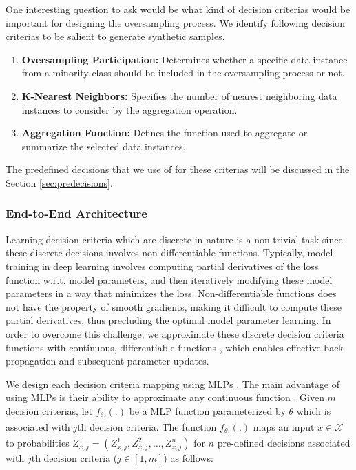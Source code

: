 One interesting question to ask would be what kind of decision criterias would be important for designing the oversampling process. We identify following decision criterias to be salient to generate synthetic samples. 
\begin{enumerate}
\item \textbf{Oversampling Participation:} Determines whether a specific data instance from a minority class should be included in the oversampling process or not.
\item \textbf{K-Nearest Neighbors:} Specifies the number of nearest neighboring data instances to consider by the aggregation operation.
\item \textbf{Aggregation Function:} Defines the function used to aggregate or summarize the selected data instances.  
\end{enumerate}

The predefined decisions that we use of for these criterias will be discussed in the Section \ref{sec:predecisions}.
\subsubsection{End-to-End Architecture}

Learning decision criteria which are discrete in nature is a non-trivial task since these discrete decisions  involves non-differentiable functions. 
Typically, model training in deep learning involves computing partial derivatives of the loss function w.r.t. model parameters, and then iteratively modifying these model parameters in a way that minimizes the loss. Non-differentiable functions does not have the property of smooth gradients, making it difficult to  compute these partial derivatives, thus precluding the optimal model parameter learning. In order to overcome this challenge, we approximate these discrete decision criteria functions with continuous, differentiable functions , which enables effective back-propagation and subsequent parameter updates.

 We design each decision criteria mapping using MLPs \cite{kruse2022multi}. The main advantage of using MLPs is their ability to approximate any continuous function \cite{hornik1989multilayer}. Given $m$ decision criterias, let $f_{{\theta}_j}(.)$ be a MLP function parameterized by $\theta$ which is associated with $j$th decision criteria. The function \( f_{{\theta}_j}(.) \) maps an input $x \in \mathcal{X}$ to probabilities \( Z_{x,j} = (Z_{x,j}^{1}, Z_{x,j}^{2}, \dots, Z_{x,j}^{n}) \) for \( n \) pre-defined decisions associated with $j$th decision criteria ($j \in [1, m]$) as follows:

